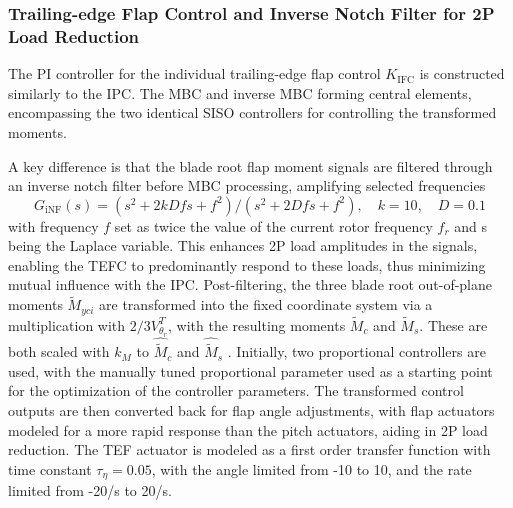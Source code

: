 \subsubsection*{Trailing-edge Flap Control and Inverse Notch Filter for 2P Load Reduction}
The PI controller for the individual trailing-edge flap control $K_{\text{IFC}}$ is constructed similarly to the IPC. The MBC and inverse MBC forming central elements, encompassing the two identical SISO controllers for controlling the transformed moments.

A key difference is that the blade root flap moment signals are filtered through an inverse notch filter before MBC processing, amplifying selected frequencies
\begin{equation*} \label{eq:Ginf}
    G_{\text{iNF}}(s) = (s^2 +2kDfs +f^2)/ (s^2 +2Dfs +f^2),\quad k=10,\quad D = 0.1
\end{equation*}
with frequency $f$ set as twice the value of the current rotor frequency $f_r$ and s being the Laplace variable. This enhances 2P load amplitudes in the signals, enabling the TEFC to predominantly respond to these loads, thus minimizing mutual influence with the IPC. Post-filtering, the three blade root out-of-plane moments $\tilde{M}_{yci}$ are transformed into the fixed coordinate system via a multiplication with $2/3 V^T_{\theta_r}$, with the resulting moments $\tilde{M}_{c}$ and $\tilde{M}_{s}$. These are both scaled with $k_M$ to $\hat{\tilde{M}}_c$ and $\hat{\tilde{M}}_s$ . Initially, two proportional controllers are used, with the manually tuned proportional parameter used as a starting point for the optimization of the controller parameters. The transformed control outputs are then converted back for flap angle adjustments, with flap actuators modeled for a more rapid response than the pitch actuators, aiding in 2P load reduction. The TEF actuator is modeled as a first order transfer function with time constant $\tau_{\eta}=0.05$, with the angle limited from -10\textdegree{} to 10\textdegree{}, and the rate limited from -20\textdegree{}/s to 20\textdegree{}/s.

